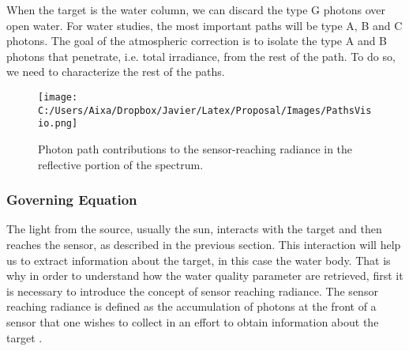 When the target is the water column, we can discard the type G photons over open water. For water studies, the most important paths will be type A, B and C photons. The goal of the atmospheric correction is to isolate the type A and B photons that penetrate, i.e. total irradiance, from the rest of the path. To do so, we need to characterize the rest of the paths.

\begin{figure}[htb]
  \centering
  \texttt{[image: C:/Users/Aixa/Dropbox/Javier/Latex/Proposal/Images/PathsVisio.png]}
\caption{Photon path contributions to the sensor-reaching radiance in the reflective portion of the spectrum.}
\label{fig:paths} 
\end{figure}

\subsubsection{Governing Equation}

The light from the source, usually the sun, interacts with the target and then reaches the sensor, as described in the previous section. This interaction will help us to extract information about the target, in this case the water body. That is why in order to understand how the water quality parameter are retrieved, first it is necessary to introduce the concept of sensor reaching radiance. The sensor reaching radiance is defined as the accumulation of photons at the front of a sensor that one wishes to collect in an effort to obtain information about the target \cite{GeraceThesis}. 


